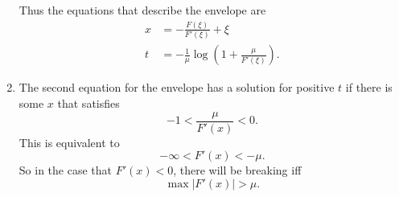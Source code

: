 \begin{Solution}
\begin{enumerate}
    Thus the equations that describe the envelope are
    \begin{align*}
      x &= -\frac{F(\xi)}{F'(\xi)} + \xi \\
      t &= -\frac{1}{\mu} \log\left(1 + \frac{\mu}{F'(\xi)} \right).
    \end{align*}
  \item
    The second equation for the envelope has a solution for positive $t$ if
    there is some $x$ that satisfies
    \[ -1< \frac{\mu}{F'(x)} < 0. \]
    This is equivalent to
    \[ -\infty < F'(x) < -\mu. \]
    So in the case that $F'(x) < 0$, there will be breaking iff
    \[ \max |F'(x)| > \mu. \]
  \end{enumerate}
\end{Solution}



